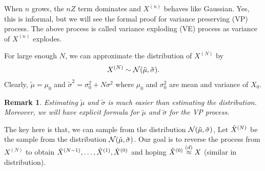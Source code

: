 \documentclass[11pt]{article}
\newtheorem{remark}{Remark}
\begin{document}
When $n$ grows, the $nZ$ term dominates and $X^{(n)}$ behaves like Gaussian.
Yes, this is informal, but we will see the formal proof for variance preserving (VP) process.
The above process is called variance exploding (VE) process as variance of $X^{(n)}$ explodes.

For large enough $N$, we can approximate the distribution of $X^{(N)}$ by
\begin{align}
    X^{(N)} \sim {\cal N}(\tilde{\mu}, \tilde{\sigma}).
\end{align}
Clearly, $\tilde{\mu} = \mu_0$ and $\tilde{\sigma}^2 = \sigma_0^2 + N\sigma^2$ where $\mu_0$ and $\sigma_0^2$ are mean and variance of $X_0$.

\begin{remark}
Estimating $\tilde{\mu}$ and $\tilde{\sigma}$ is much easier than estimating the distribution.
Moreover, we will have explicit formula for $\tilde{\mu}$ and $\tilde{\sigma}$ for the VP process.
\end{remark}

The key here is that, we can sample from the distribution ${\cal N}(\tilde{\mu}, \tilde{\sigma})$,
Let $\tilde{X}^{(N)}$ be the sample from the distribution ${\cal N}(\tilde{\mu}, \tilde{\sigma})$.
Our goal is to reverse the process from $X^{(N)}$ to obtain $\tilde{X}^{(N-1)}, \dots, \tilde{X}^{(1)}, \tilde{X}^{(0)}$ 
and hoping $\tilde{X}^{(0)} \stackrel{(d)}{\approx} X$ (similar in distribution).
\end{document}
